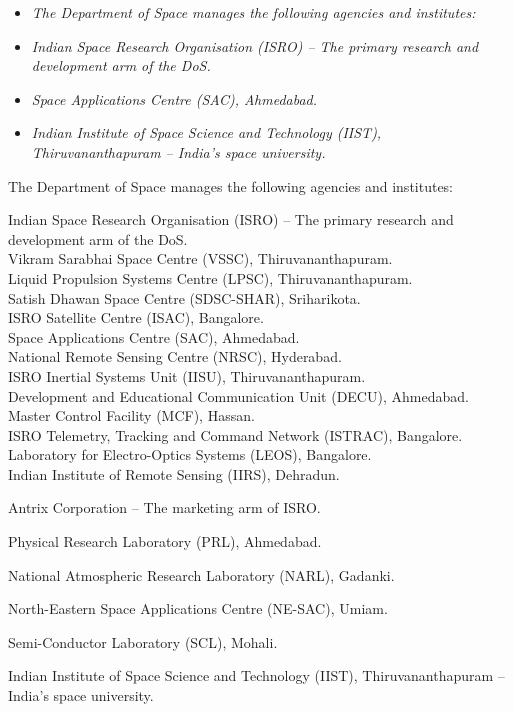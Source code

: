 \begin{itemize}
\item
  \emph{The Department of Space manages the following agencies and
  institutes:}
\item
  \emph{Indian Space Research Organisation (ISRO) -- The primary
  research and development arm of the DoS.}
\item
  \emph{Space Applications Centre (SAC), Ahmedabad.}
\item
  \emph{Indian Institute of Space Science and Technology (IIST),
  Thiruvananthapuram -- India's space university.}
\end{itemize}

The Department of Space manages the following agencies and institutes:

Indian Space Research Organisation (ISRO) -- The primary research and
development arm of the DoS.\\
Vikram Sarabhai Space Centre (VSSC), Thiruvananthapuram.\\
Liquid Propulsion Systems Centre (LPSC), Thiruvananthapuram.\\
Satish Dhawan Space Centre (SDSC-SHAR), Sriharikota.\\
ISRO Satellite Centre (ISAC), Bangalore.\\
Space Applications Centre (SAC), Ahmedabad.\\
National Remote Sensing Centre (NRSC), Hyderabad.\\
ISRO Inertial Systems Unit (IISU), Thiruvananthapuram.\\
Development and Educational Communication Unit (DECU), Ahmedabad.\\
Master Control Facility (MCF), Hassan.\\
ISRO Telemetry, Tracking and Command Network (ISTRAC), Bangalore.\\
Laboratory for Electro-Optics Systems (LEOS), Bangalore.\\
Indian Institute of Remote Sensing (IIRS), Dehradun.

Antrix Corporation -- The marketing arm of ISRO.

Physical Research Laboratory (PRL), Ahmedabad.

National Atmospheric Research Laboratory (NARL), Gadanki.

North-Eastern Space Applications Centre (NE-SAC), Umiam.

Semi-Conductor Laboratory (SCL), Mohali.

Indian Institute of Space Science and Technology (IIST),
Thiruvananthapuram -- India's space university.

